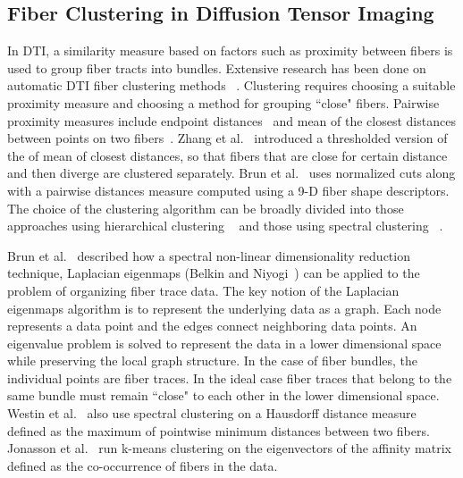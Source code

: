\subsection {Fiber Clustering in Diffusion Tensor Imaging}
\label {subsec:fiberClus}
In DTI, a similarity measure based on factors such as proximity between fibers is used to group fiber tracts into bundles. Extensive research has been done on automatic DTI fiber clustering methods~ \cite{Brun2004,Brun2003,Corouge2004,westinMEDIA02,Zhang2008}. 
Clustering requires choosing a suitable proximity measure and choosing a method for grouping ``close" fibers.
Pairwise proximity measures include endpoint distances~\cite{Brun2003} and mean of the closest distances between points on two fibers~\cite{Corouge2004}. Zhang et al.~\cite{Zhang2008} introduced a thresholded version of the of mean of closest distances, so that fibers that are close for certain distance and then diverge are clustered separately. Brun et al.~\cite{Brun2004} uses normalized cuts along with a pairwise distances  measure computed using a 9-D fiber shape descriptors. The choice of the clustering algorithm can be broadly divided into those approaches using hierarchical clustering ~\cite{Moberts2005, Zhang2008} and those using spectral clustering ~\cite{ Brun2004,jonasson2005, ODonnell2007}.
 
Brun et al.~\cite{Brun2003} described how a spectral non-linear dimensionality reduction technique,  Laplacian eigenmaps (Belkin and Niyogi~\cite{Belkin01}) can be applied to the problem of organizing fiber trace data. The key notion of the Laplacian eigenmaps algorithm is to represent the underlying data as a graph. Each node represents a data point and the edges connect neighboring data points. An eigenvalue problem is solved to represent the data in a lower dimensional space while preserving the local graph structure. In the case of fiber bundles, the individual points are fiber traces. In the ideal case fiber traces that belong to the same bundle must remain ``close" to each other in the lower dimensional space. Westin et al.~\cite{westinMEDIA02} also use spectral clustering on a Hausdorff distance measure defined as the maximum of pointwise minimum distances between two fibers. Jonasson et al.~\cite{jonasson2005} run k-means clustering on the eigenvectors of the affinity matrix defined as the co-occurrence of fibers in the data.

